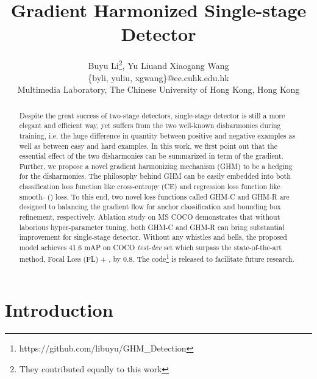 \documentclass[letterpaper]{article} \usepackage{aaai19}  \usepackage{times}  \usepackage{helvet}  \usepackage{courier}  \usepackage{url}  \usepackage{graphicx}  \usepackage{amsmath,amssymb}
\begin{document}
\title{Gradient Harmonized Single-stage Detector}
\author{Buyu Li\thanks{They contributed equally to this work}, Yu Liu\footnotemark[1] and Xiaogang Wang\\
\{byli, yuliu, xgwang\}@ee.cuhk.edu.hk\\
Multimedia Laboratory, The Chinese University of Hong Kong, Hong Kong\\
}
\maketitle
\begin{abstract}
Despite the great success of two-stage detectors, single-stage detector is still a more elegant and efficient way, yet suffers from the two well-known disharmonies during training, i.e. the huge difference in quantity between positive and negative examples as well as between easy and hard examples. In this work, we first point out that the essential effect of the two disharmonies can be summarized in term of the gradient. Further, we propose a novel gradient harmonizing mechanism (GHM) to be a hedging for the disharmonies. The philosophy behind GHM can be easily embedded into both classification loss function like cross-entropy (CE) and regression loss function like smooth- () loss. To this end, two novel loss functions called GHM-C and GHM-R are designed to balancing the gradient flow for anchor classification and bounding box refinement, respectively. Ablation study on MS COCO demonstrates that without laborious hyper-parameter tuning, both GHM-C and GHM-R can bring substantial improvement for single-stage detector. Without any whistles and bells, the proposed model achieves 41.6 mAP on COCO \textit{test-dev} set which surpass the state-of-the-art method, Focal Loss (FL) + , by 0.8. The code\footnote{https://github.com/libuyu/GHM\_Detection} is released to facilitate future research. 
\end{abstract}

\section{Introduction}
\end{document}
